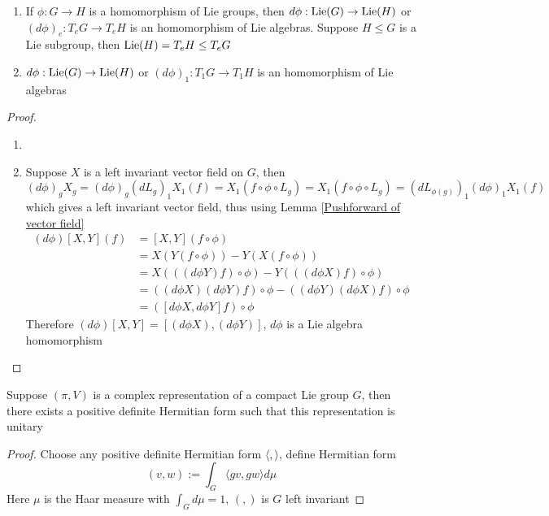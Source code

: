 \documentclass[main]{subfiles}
\begin{document}
\begin{theorem}\hfill
\begin{enumerate}
\item If $\phi:G\to H$ is a homomorphism of Lie groups, then $d\phi:\operatorname{Lie}(G)\to\operatorname{Lie}(H)$ or $(d\phi)_e:T_eG\to T_eH$ is an homomorphism of Lie algebras. Suppose $H\leq G$ is a Lie subgroup, then $\operatorname{Lie}(H)=T_eH\leq T_eG$
\item $d\phi:\operatorname{Lie}(G)\to\operatorname{Lie}(H)$ or $(d\phi)_1:T_1G\to T_1H$ is an homomorphism of Lie algebras
\end{enumerate}
\end{theorem}

\begin{proof}
\begin{enumerate}
\item 
\item Suppose $X$ is a left invariant vector field on $G$, then $(d\phi)_gX_g=(d\phi)_g(dL_g)_1X_1(f)=X_1(f\circ\phi\circ L_g)=X_1(f\circ\phi\circ L_g)=(dL_{\phi(g)})_1(d\phi)_1X_1(f)$ which gives a left invariant vector field, thus using Lemma \ref{Pushforward of vector field} \begin{align*}
(d\phi)[X,Y](f)&=[X,Y](f\circ\phi) \\
&=X(Y(f\circ\phi))-Y(X(f\circ\phi)) \\
&=X(((d\phi Y)f)\circ\phi)-Y(((d\phi X)f)\circ\phi) \\
&=((d\phi X)(d\phi Y)f)\circ\phi-((d\phi Y)(d\phi X)f)\circ\phi \\
&=([d\phi X,d\phi Y]f)\circ\phi
\end{align*}
Therefore $(d\phi)[X,Y]=[(d\phi X),(d\phi Y)]$, $d\phi$ is a Lie algebra homomorphism
\end{enumerate}
\end{proof}

\begin{proposition}
Suppose $(\pi,V)$ is a complex representation of a compact Lie group $G$, then there exists a positive definite Hermitian form such that this representation is unitary
\end{proposition}

\begin{proof}
Choose any positive definite Hermitian form $\langle,\rangle$, define Hermitian form
\[(v,w):=\displaystyle\int_G\langle gv,gw\rangle d\mu\]
Here $\mu$ is the Haar measure with $\displaystyle\int_G d\mu=1$, $(,)$ is $G$ left invariant
\end{proof}
\end{document}
